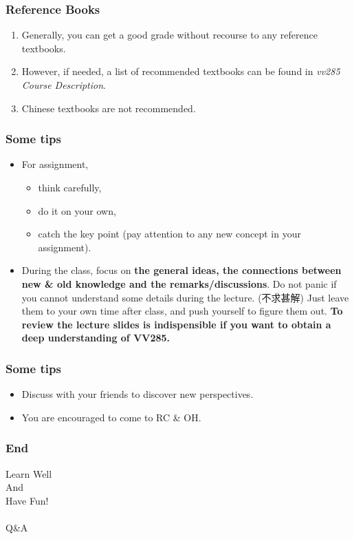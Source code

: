 \documentclass[UTF8]{beamer}
\newcommand{\nullspace}{~\\[15pt]}
\begin{document}
\begin{frame}
    \frametitle{Reference Books}
    \begin{enumerate}
        \item Generally, you can get a good grade without recourse to any reference textbooks.
        \item However, if needed, a list of recommended textbooks can be found in \textit{vv285 Course Description}.
        \item Chinese textbooks are not recommended.
    \end{enumerate}
\end{frame}

\begin{frame}
    \frametitle{Some tips}
    \begin{itemize}
        \item
              For assignment,
              \begin{itemize}
                  \item think carefully,
                  \item do it on your own,
                  \item catch the key point (pay attention to any new concept in your assignment).
              \end{itemize}
        \item During the class, focus on \textbf{the general ideas, the connections between new \& old knowledge and the remarks/discussions}. Do not panic if you cannot understand some details during the lecture. (不求甚解) Just leave them to your own time after class, and push yourself to figure them out. \textbf{To review the lecture slides is indispensible if you want to obtain a deep understanding of VV285.}
    \end{itemize}
\end{frame}

\begin{frame}
    \frametitle{Some tips}
    \begin{itemize}
        \item Discuss with your friends to discover new perspectives.
        \item You are encouraged to come to RC \& OH.
    \end{itemize}
\end{frame}

\begin{frame}
    \frametitle{End}
    \begin{center}
        \huge
        Learn Well\\
        And\\
        Have Fun!\\
        \nullspace
        \large
        Q\&A
    \end{center}
\end{frame}
\end{document}
